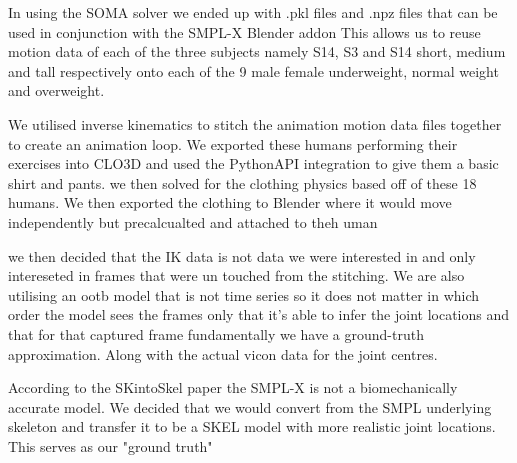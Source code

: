 In using the SOMA solver we ended up with .pkl files and .npz files that can be used in conjunction with the SMPL-X Blender addon
This allows us to reuse motion data of each of the three subjects namely S14, S3 and S14 short, medium and tall respectively onto
each of the 9 male female underweight, normal weight and overweight.

We utilised inverse kinematics to stitch the animation motion data files together to create an animation loop.
We exported these humans performing their exercises into CLO3D and used the PythonAPI integration to give them a basic
shirt and pants. we then solved for the clothing physics based off of these 18 humans. 
We then exported the clothing to Blender where it would move independently but precalcualted and attached to theh uman

we then decided that the IK data is not data we were interested in and only intereseted in frames that were un touched 
from the stitching. We are also utilising an ootb model that is not time series so it does not matter in which order the model
sees the frames only that it's able to infer the joint locations and that for that captured frame fundamentally we have a ground-truth approximation.
Along with the actual vicon data for the joint centres.

According to the SKintoSkel paper the SMPL-X is not a biomechanically accurate model. We decided that we would convert from
the SMPL underlying skeleton and transfer it to be a SKEL model with more realistic joint locations. This serves as our "ground truth"


\label{sec:relatedwork}

